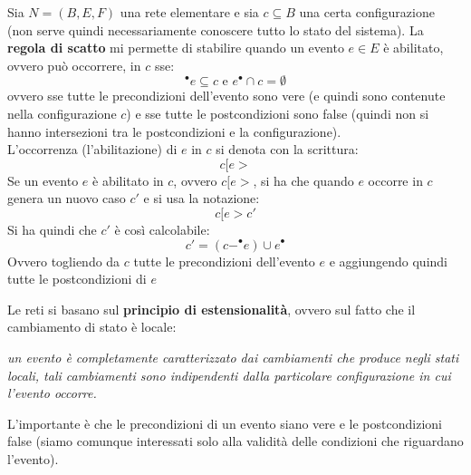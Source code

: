 \documentclass[a4paper,12pt, oneside]{book}
\begin{document}
\begin{definizione}
  Sia $N=(B,E,F)$ una rete elementare e sia $c\subseteq B$ una certa
  configurazione (non serve quindi necessariamente conoscere tutto lo stato del
  sistema). La \textbf{regola di scatto} mi permette di stabilire quando
  un evento $e\in E$ è abilitato, ovvero può occorrere, in $c$ sse:
  \[^\bullet e\subseteq c \mbox{ e } e^\bullet \cap c = \emptyset\]
  ovvero sse tutte le precondizioni dell'evento sono vere (e quindi sono
  contenute nella configurazione $c$) e sse tutte le postcondizioni sono false
  (quindi non si hanno intersezioni tra le postcondizioni e la
  configurazione). \\
  L'occorrenza (l'abilitazione) di $e$ in $c$ si denota con la scrittura:
  \[c[e >\]
  Se un evento $e$ è abilitato in $c$, ovvero $c[e >$, si ha che quando $e$
  occorre in $c$ genera un nuovo caso $c'$ e si usa la notazione:
  \[c[e > c'\]
  Si ha quindi che $c'$ è così calcolabile:
  \[c'=(c-^\bullet e)\cup e^\bullet\]
  Ovvero togliendo da $c$ tutte le precondizioni dell'evento $e$ e aggiungendo
  quindi tutte le postcondizioni di $e$
\end{definizione}
Le reti si basano sul \textbf{principio di estensionalità}, ovvero sul fatto che
il cambiamento di stato è locale:
\begin{center}
  \textit{un evento è completamente caratterizzato dai cambiamenti che produce
    negli stati locali, tali cambiamenti sono indipendenti dalla particolare
    configurazione in cui l’evento occorre.}
\end{center}
L'importante è che le precondizioni di un evento siano vere e le postcondizioni
false (siamo comunque interessati solo alla validità delle condizioni che
riguardano l'evento).
\end{document}
